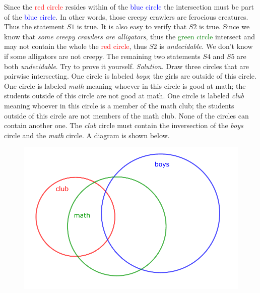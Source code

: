 \begin{multicols}{2}
	Since the \textcolor{red}{red circle} resides within of the \textcolor{blue}{blue circle} the intersection must be part of the \textcolor{blue}{blue circle}.
	In other words, those creepy crawlers are ferocious creatures. Thus the statement $S1$ is true.
	\vskip 0.1cm
	It is also easy to verify that $S2$ is true.
	\vskip 0.1cm
	Since we know that \textit{some creepy crawlers are alligators}, thus the \textcolor{green}{green circle} intersect
	and may not contain the whole the \textcolor{red}{red circle}, thus $S2$ is \textit{undecidable.}
	We don't know if some alligators are not creepy.
	\vskip 0.1cm
	The remaining two statements $S4$ and $S5$ are both \textit{undecidable}. Try to prove it yourself.
	\vskip 0.1cm
	\vskip 0.1cm
	\textit{Solution.}
	Draw three circles that are pairwise intersecting. One circle is labeled \textit{boys}; the girls are outside of this circle. One circle is labeled \textit{math} meaning whoever in this circle is good at math; the students outside of this circle are not good at math. One circle is labeled \textit{club} meaning whoever in this circle is a member of the math club; the students outside of this circle are not members of the math club.
	None of the circles can contain another one. The \textit{club} circle must contain the inversection of the \textit{boys} circle and the \textit{math} circle.
	A diagram is shown below.
	\begin{figure}[H]
		\centering
		\captionsetup{labelformat= empty, justification=centering}
		\includegraphics[width= 1\linewidth]{pi-2023-01-04.pdf}

\end{figure}
\end{multicols}
